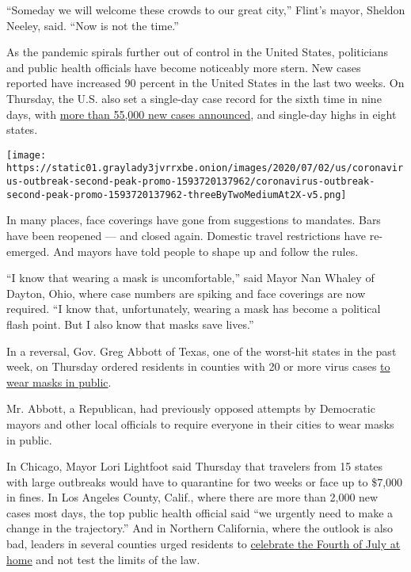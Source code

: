 ``Someday we will welcome these crowds to our great city,'' Flint's
mayor, Sheldon Neeley, said. ``Now is not the time.''

As the pandemic spirals further out of control in the United States,
politicians and public health officials have become noticeably more
stern. New cases reported have increased 90 percent in the United States
in the last two weeks. On Thursday, the U.S. also set a single-day case
record for the sixth time in nine days, with
\href{https://www.nytimes3xbfgragh.onion/interactive/2020/us/coronavirus-us-cases.html}{more
than 55,000 new cases announced}, and single-day highs in eight states.

\texttt{[image: https://static01.graylady3jvrrxbe.onion/images/2020/07/02/us/coronavirus-outbreak-second-peak-promo-1593720137962/coronavirus-outbreak-second-peak-promo-1593720137962-threeByTwoMediumAt2X-v5.png]}

In many places, face coverings have gone from suggestions to mandates.
Bars have been reopened --- and closed again. Domestic travel
restrictions have re-emerged. And mayors have told people to shape up
and follow the rules.

``I know that wearing a mask is uncomfortable,'' said Mayor Nan Whaley
of Dayton, Ohio, where case numbers are spiking and face coverings are
now required. ``I know that, unfortunately, wearing a mask has become a
political flash point. But I also know that masks save lives.''

In a reversal, Gov. Greg Abbott of Texas, one of the worst-hit states in
the past week, on Thursday ordered residents in counties with 20 or more
virus cases
\href{https://www.nytimes3xbfgragh.onion/2020/07/02/us/coronavirus-texas-masks.html}{to
wear masks in public}.

Mr. Abbott, a Republican, had previously opposed attempts by Democratic
mayors and other local officials to require everyone in their cities to
wear masks in public.

In Chicago, Mayor Lori Lightfoot said Thursday that travelers from 15
states with large outbreaks would have to quarantine for two weeks or
face up to \$7,000 in fines. In Los Angeles County, Calif., where there
are more than 2,000 new cases most days, the top public health official
said ``we urgently need to make a change in the trajectory.'' And in
Northern California, where the outlook is also bad, leaders in several
counties urged residents to
\href{https://www.nytimes3xbfgragh.onion/2020/07/02/us/coronavirus-fourth-of-july.html}{celebrate
the Fourth of July at home} and not test the limits of the law.

